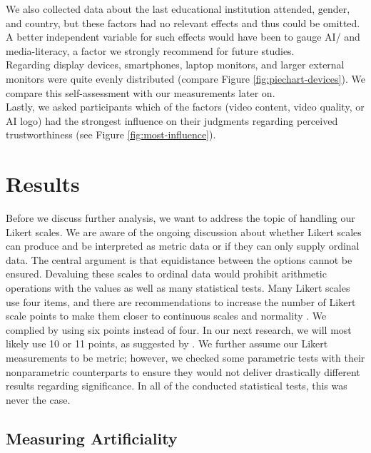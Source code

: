 \documentclass[
  a4paper,  %
  twoside,  %
  bibliography=totoc,
  headsepline,
  cleardoublepage=empty,
  parskip=half,
  draft=false
]{scrbook}
\begin{document}
We also collected data about the last educational institution attended, gender, and country, but these factors had no relevant effects and thus could be omitted. A better independent variable for such effects would have been to gauge AI/ and media-literacy, a factor we strongly recommend for future studies.\\
Regarding display devices, smartphones, laptop monitors, and larger external monitors were quite evenly distributed (compare Figure \ref{fig:piechart-devices}). We compare this self-assessment with our measurements later on. \\
Lastly, we asked participants which of the factors (video content, video quality, or AI logo) had the strongest influence on their judgments regarding perceived trustworthiness (see Figure \ref{fig:most-influence}).

\section{Results}
\label{sec:results}

Before we discuss further analysis, we want to address the topic of handling our Likert scales. We are aware of the ongoing discussion about whether Likert scales can produce and be interpreted as metric data or if they can only supply ordinal data. The central argument is that equidistance between the options cannot be ensured. Devaluing these scales to ordinal data would prohibit arithmetic operations with the values as well as many statistical tests. Many Likert scales use four items, and there are recommendations to increase the number of Likert scale points to make them closer to continuous scales and normality \cite{wuCanLikertScales2017a}. We complied by using six points instead of four. In our next research, we will most likely use 10 or 11 points, as suggested by . We further assume our Likert measurements to be metric; however, we checked some parametric tests with their nonparametric counterparts to ensure they would not deliver drastically different results regarding significance. In all of the conducted statistical tests, this was never the case.

\subsection{Measuring Artificiality}
\end{document}
